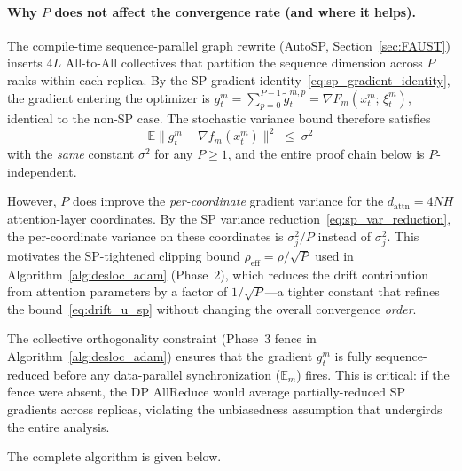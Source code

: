 \documentclass{article}
\begin{document}
\paragraph{Why $P$ does not affect the convergence rate (and where it helps).}
The compile-time sequence-parallel graph rewrite (AutoSP,
Section~\ref{sec:FAUST}) inserts $4L$ All-to-All collectives that
partition the sequence dimension across $P$ ranks within each
replica. By the SP gradient identity~\eqref{eq:sp_gradient_identity},
the gradient entering the optimizer is
$g_t^m = \sum_{p=0}^{P-1} \tilde{g}_t^{m,p} = \nabla F_m(x_t^m;\,\xi_t^m)$,
identical to the non-SP case.
The stochastic variance bound therefore satisfies
\begin{equation}
\mathbb{E}\bigl\|g_t^m - \nabla f_m(x_t^m)\bigr\|^2 \;\leq\; \sigma^2
\label{eq:sp_variance_invariance}
\end{equation}
with the \emph{same} constant $\sigma^2$ for any $P \geq 1$, and the entire
proof chain below is $P$-independent.

However, $P$ does improve the \emph{per-coordinate} gradient variance for the
$d_{\text{attn}} = 4NH$ attention-layer coordinates.
By the SP variance reduction~\eqref{eq:sp_var_reduction}, the
per-coordinate variance on these coordinates is $\sigma_j^2/P$ instead of
$\sigma_j^2$. This motivates the SP-tightened clipping bound
$\rho_{\text{eff}} = \rho/\sqrt{P}$ used in
Algorithm~\ref{alg:desloc_adam} (Phase~2), which reduces the drift
contribution from attention parameters by a factor of $1/\sqrt{P}$---a
tighter constant that refines the bound~\eqref{eq:drift_u_sp}
without changing the overall convergence \emph{order}.

The collective orthogonality constraint (Phase~3 fence in
Algorithm~\ref{alg:desloc_adam}) ensures that the gradient $g_t^m$
is fully sequence-reduced before any data-parallel synchronization
($\mathbb{E}_m$) fires. This is critical: if the fence were absent,
the DP AllReduce would average partially-reduced SP gradients across
replicas, violating the unbiasedness assumption that undergirds
the entire analysis.

The complete algorithm is given below.
\end{document}
